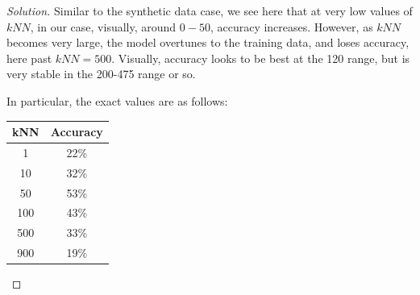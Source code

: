 \documentclass[10pt]{article}
\begin{document}
\begin{proof}[Solution]
Similar to the synthetic data case, we see here that at very low values of $kNN$, in our case, visually, around $0-50$, accuracy increases. However, as $kNN$ becomes very large, the model overtunes to the training data, and loses accuracy, here past $kNN = 500$. Visually, accuracy looks to be best at the 120 range, but is very stable in the 200-475 range or so.

In particular, the exact values are as follows:

\begin{center}
\begin{tabular}{|| c| c||}
\hline
kNN & Accuracy \\

\hline \hline
1 & 22\% \\ \hline
10 & 32\% \\ \hline
50 & 53\% \\ \hline
100 & 43\% \\ \hline
500 & 33\% \\ \hline
900 &  19\% \\ \hline
\end{tabular}
\end{center}

\end{proof}
\end{document}
